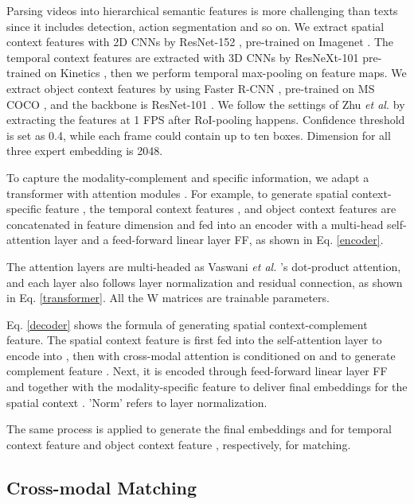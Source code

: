 \documentclass{article}
\begin{document}
Parsing videos into hierarchical semantic features is more challenging than texts since it includes detection, action segmentation and so on.  We extract spatial context features  with 2D CNNs by ResNet-152 \cite{2D_CNNs}, pre-trained on Imagenet \cite{imagenet}. The temporal context features  are extracted with 3D CNNs by ResNeXt-101 \cite{3D_CNNs} pre-trained on Kinetics \cite{kinetics}, then we perform temporal max-pooling on feature maps. We extract object context features  by using Faster R-CNN \cite{faster_rcnn}, pre-trained on MS COCO \cite{lin2015microsoft}, and the backbone is ResNet-101 \cite{2D_CNNs}. We follow the settings of Zhu \textit{et al.} \cite{Zhu_2020_Actbert} by extracting the features at 1 FPS after RoI-pooling happens. Confidence threshold is set as 0.4, while each frame could contain up to ten boxes. Dimension for all three expert embedding is 2048.

To capture the modality-complement and specific information, we adapt a transformer with attention modules \cite{NIPS2017_3f5ee243,gabeur2020mmt, devlin-etal-2019-bert, MDVC_Iashin_2020}. For example, to generate spatial context-specific feature , the temporal context features , and object context features  are concatenated in feature dimension and fed into an encoder with a multi-head self-attention layer and a feed-forward linear layer FF, as shown in Eq. \ref{encoder}.



The attention layers are multi-headed as Vaswani \textit{et al.} \cite{NIPS2017_3f5ee243}'s dot-product attention, and each layer also follows layer normalization and residual connection, as shown in Eq. \ref{transformer}. All the W matrices are trainable parameters. 



Eq. \ref{decoder} shows the formula of generating spatial context-complement feature. The spatial context feature  is first fed into the self-attention layer to encode into , then with cross-modal attention is conditioned on  and  to generate complement feature . Next, it is encoded through feed-forward linear layer FF and together with the modality-specific feature  to deliver final embeddings for the spatial context . 'Norm' refers to layer normalization. 



The same process is applied to generate the final embeddings  and  for temporal context feature  and object context feature , respectively, for matching. 

\subsection{Cross-modal Matching}
\label{sec:methodmatch}
\end{document}

